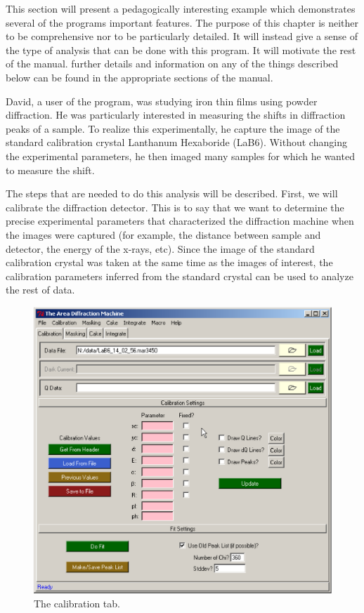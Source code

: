 This section will present a pedagogically interesting 
example which demonstrates several of the programs important
features.  The purpose of this chapter is neither to be 
comprehensive nor to be particularly detailed. It will instead 
give a sense of the type of analysis that can be done with 
this program. It will motivate the rest of the manual. further details 
and information on any of the things described below can be found in 
the appropriate sections of the manual.

David, a user of the program, was studying iron thin films 
using powder diffraction. He was particularly interested in 
measuring the shifts in diffraction peaks of a sample. To 
realize this experimentally, he capture the image of the 
standard calibration crystal Lanthanum Hexaboride (LaB6). 
Without changing the experimental parameters, he then imaged 
many samples for which he wanted to measure the shift.

The steps that are needed to do this analysis will be
described. First, we will calibrate the diffraction detector.
This is to say that we want to determine the precise 
experimental parameters that characterized the diffraction
machine when the images were captured (for example, the distance
between sample and detector, the energy of the x-rays, etc). Since 
the image of the standard calibration crystal was taken at the same
time as the images of interest, the calibration parameters inferred
from the standard crystal can be used to analyze the
rest of data.

\begin{figure}
    \centering
    \includegraphics[scale=.75]{figures/calibration_tab.eps}
    \caption{The calibration tab.}
    \label{calibration_tab_example}
\end{figure}

